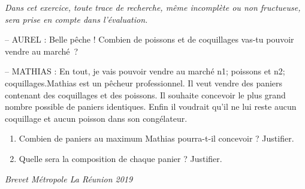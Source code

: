 \documentclass[exercice]{thedocument}%
\begin{document}
%
{\itshape Dans cet exercice, toute trace de recherche, même incomplète ou non
fructueuse, sera prise en compte dans l'évaluation.}
\par\vskip15pt\noindent-- AUREL : Belle pêche ! Combien de poissons et de coquillages
vas-tu pouvoir vendre au marché~?
\par\noindent-- MATHIAS : En tout, je vais pouvoir vendre au marché \<n1; poissons
et \<n2; coquillages.\vskip15pt\noindent Mathias est un pêcheur professionnel.
Il veut vendre des paniers contenant des coquillages et des poissons. Il
souhaite concevoir le plus grand nombre possible de paniers identiques. Enfin
il voudrait qu'il ne lui reste aucun coquillage et aucun poisson dans son
congélateur.
\begin{enumerate}
    \item Combien de paniers au maximum Mathias pourra-t-il concevoir ? Justifier.
    \item Quelle sera la composition de chaque panier ? Justifier.
\end{enumerate}\vskip10pt\hfill{\itshape Brevet Métropole La Réunion 2019}
\end{document}
